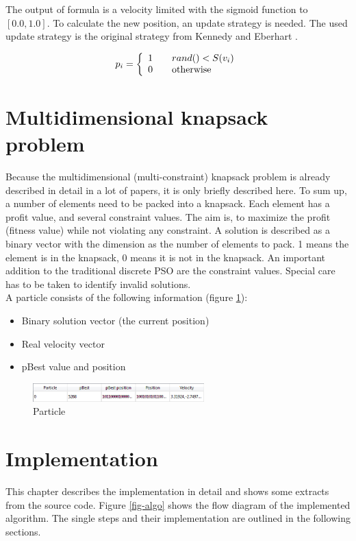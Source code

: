\documentclass{article}
\begin{document}
The output of formula is a velocity limited with the sigmoid function to $[0.0, 1.0]$. To calculate the new position, an update strategy is needed. The used update strategy is the original strategy from Kennedy and Eberhart \cite{bib-discrete}.

\begin{equation}
p_i = \left\{ 
\begin{array}{l l}
  1 & \quad \text{$rand() < S(v_i)$}\\
  0 & \quad \text{otherwise}
\end{array} \right.
\end{equation}


\section{Multidimensional knapsack problem}
\label{lbl-mknap}
Because the multidimensional (multi-constraint) knapsack problem is already described in detail in a lot of papers, it is only briefly described here. To sum up, a number of elements need to be packed into a knapsack. Each element has a profit value, and several constraint values. The aim is, to maximize the profit (fitness value) while not violating any constraint. A solution is described as a binary vector with the dimension as the number of elements to pack. 1 means the element is in the knapsack, 0 means it is not in the knapsack. An important addition to the traditional discrete PSO are the constraint values. Special care has to be taken to identify invalid solutions.\\

A particle consists of the following information (figure \ref{fig-particle}):
\begin{itemize}
\item Binary solution vector (the current position)
\item Real velocity vector
\item pBest value and position
\end{itemize}

\begin{figure}[H]
    \centering
    \includegraphics[width=250px]{images/particle.PNG}
    \caption{Particle}
    \label{fig-particle}
\end{figure}

\section{Implementation}
\label{lbl-impl}
This chapter describes the implementation in detail and shows some extracts from the source code. Figure \ref{fig-algo} shows the flow diagram of the implemented algorithm. The single steps and their implementation are outlined in the following sections.
\end{document}

